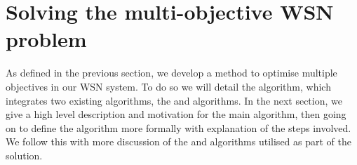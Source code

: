 \section{Solving the multi-objective WSN problem}
\label{section:solution}
As defined in the previous section, we develop a method to optimise multiple objectives in our WSN system. To do so we will detail the \acronymWSNOptimisationExtended{}{} algorithm, which integrates two existing algorithms, the \acronymATARIAExtended{}{} and \acronymMGRAOExtended{}{} algorithms. In the next section, we give a high level description and motivation for the main \acronymWSNOptimisation{}{} algorithm, then going on to define the algorithm more formally with explanation of the steps involved. We follow this with more discussion of the \acronymATARIA{}{} and \acronymMGRAO{}{} algorithms utilised as part of the solution.
